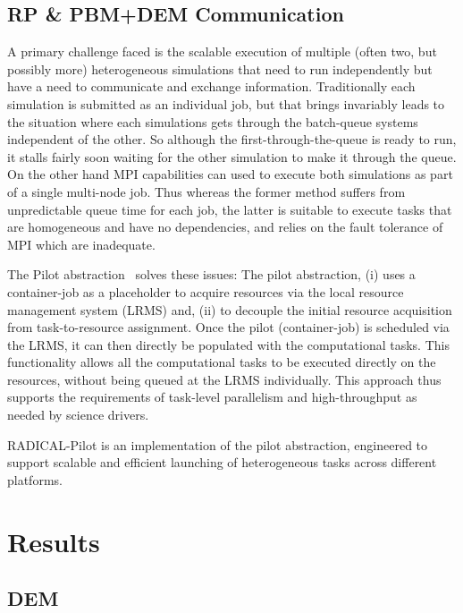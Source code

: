 \documentclass[preprint,11pt,authoryear]{elsarticle}
\begin{document}
\subsection{RP \& PBM+DEM Communication}


A primary challenge faced is the scalable execution of multiple (often two,
but possibly more) heterogeneous simulations that need to run independently
but have a need to communicate and exchange information. Traditionally each
simulation is submitted as an individual job, but that brings invariably leads
to the situation where each simulations gets through the batch-queue systems
independent of the other. So although the first-through-the-queue is ready to
run, it stalls fairly soon waiting for the other simulation to make it through
the queue.  On the other hand MPI capabilities can used to  execute both
simulations as part of a single multi-node job.  Thus whereas the former
method suffers from unpredictable queue time for each job, the latter is
suitable to execute tasks that are homogeneous and have no dependencies, and
relies on the fault tolerance of MPI which are inadequate.


The Pilot abstraction~\cite{review_pilotreview} solves these issues:  The
pilot abstraction, (i) uses a container-job as a placeholder to acquire
resources via the local resource management system (LRMS) and,  (ii) to
decouple the initial resource acquisition from task-to-resource assignment.
Once the pilot (container-job) is scheduled via the LRMS, it can then directly
be populated with the computational tasks. This functionality allows all the
computational tasks to be executed directly on the resources, without being
queued at the LRMS individually. This approach thus supports the requirements
of task-level parallelism and high-throughput as needed by science drivers.

RADICAL-Pilot is an implementation of the pilot abstraction, engineered to
support scalable and efficient launching of heterogeneous tasks
across different platforms.



\section{Results}

\subsection{DEM}
\end{document}
